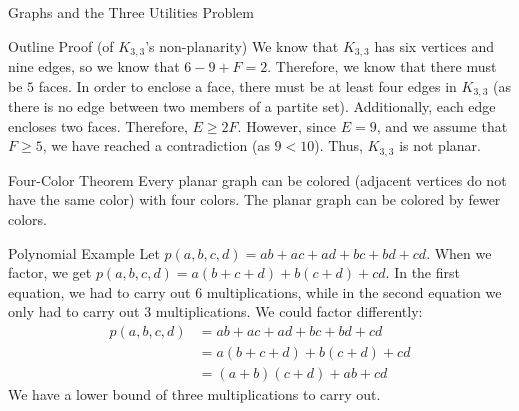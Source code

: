 \documentclass[10pt]{extarticle}
\begin{document}
{\begin{problem}{Graphs and the Three Utilities Problem}
\begin{problem}{Outline Proof (of $K_{3,3}$'s non-planarity)}
      We know that $K_{3,3}$ has six vertices and nine edges, so we know that $6-9+F = 2$. Therefore, we know that there must be $5$ faces. In order to enclose a face, there must be at least four edges in $K_{3,3}$ (as there is no edge between two members of a partite set). Additionally, each edge encloses two faces. Therefore, $E\geq 2F$. However, since $E = 9$, and we assume that $F\geq 5$, we have reached a contradiction (as $9<10$). Thus, $K_{3,3}$ is not planar.
    \end{problem}
    \begin{problem}{Four-Color Theorem}
      Every planar graph can be colored (adjacent vertices do not have the same color) with four colors. The planar graph can be colored by fewer colors.
    \end{problem}
    \begin{problem}{Polynomial Example}
      Let $p(a,b,c,d) = ab + ac + ad + bc +bd + cd$. When we factor, we get $p(a,b,c,d) = a(b+c+d) + b(c+d) + cd$. In the first equation, we had to carry out 6 multiplications, while in the second equation we only had to carry out 3 multiplications. We could factor differently:
      \begin{align*}
        p(a,b,c,d) &= ab + ac + ad + bc + bd + cd \\
                   &= a(b+c+d) + b(c+d) + cd\\
                   &= (a+b)(c+d) + ab + cd
      \end{align*}
      We have a lower bound of three multiplications to carry out.\\


\end{problem}
\end{problem}}
\end{document}
